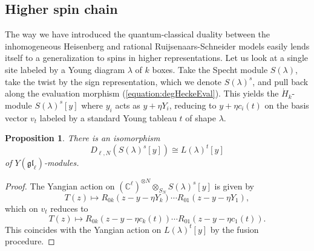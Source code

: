 \documentclass[11pt]{report}
\newtheorem{prop}[theorem]{Proposition}
\theoremstyle{definition}
\theoremstyle{remark}
\theoremstyle{remark}
\newcommand{\C}{\mathbb{C}}
\begin{document}
\subsection{Higher spin chain}

The way we have introduced the quantum-classical duality between the inhomogeneous Heisenberg and rational Ruijsenaars-Schneider models easily lends itself to a generalization to spins in higher representations.
%
Let us look at a single site labeled by a Young diagram $\lambda$ of $k$ boxes. Take the Specht module $S(\lambda)$, take the twist by the sign representation, which we denote $S(\lambda)^s$, and pull back along the evaluation morphism (\ref{equation:degHeckeEval}). This yields the $\dot H_k$-module $S(\lambda)^s[y]$ where $y_i$ acts as $y+\eta Y_i$, reducing to $y+\eta c_i(t)$ on the basis vector $v_t$ labeled by a standard Young tableau $t$ of shape $\lambda$.

\begin{prop}
There is an isomorphism
\begin{equation*}
D_{\ell,N}(S(\lambda)^s[y]) \cong L(\lambda)^t[y]
\end{equation*}
of $Y(\mathfrak{gl}_\ell)$-modules.
\end{prop}

\begin{proof}
The Yangian action on $(\C^\ell)^{\otimes N} \otimes_{S_N} S(\lambda)^s[y]$ is given by
\begin{equation*}
T(z) \mapsto R_{0k}(z-y-\eta Y_k) \cdots R_{01}(z-y-\eta Y_1),
\end{equation*}
which on $v_t$ reduces to
\begin{equation*}
T(z) \mapsto R_{0k}(z-y-\eta c_k(t)) \cdots R_{01}(z-y-\eta c_1(t)).
\end{equation*}
This coincides with the Yangian action on $L(\lambda)^t[y]$ by the fusion procedure.
\end{proof}
\end{document}
